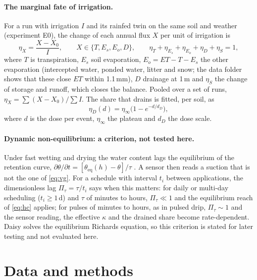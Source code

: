 \documentclass[preprint,12pt,authoryear]{elsarticle}
\newcommand{\ET}{\mathit{ET}}
\begin{document}
\paragraph{The marginal fate of irrigation.}
For a run with irrigation $I$ and its rainfed twin on the same soil and weather (experiment E0), the change of each annual flux $X$ per unit of irrigation is
\begin{equation}
\eta_X=\frac{X-X_{0}}{I},\qquad X\in\{T,E_s,E_o,D\},\qquad \eta_T+\eta_{E_s}+\eta_{E_o}+\eta_D+\eta_S=1,
\label{eq:eta}
\end{equation}
where $T$ is transpiration, $E_s$ soil evaporation, $E_o=\ET-T-E_s$ the other evaporation (intercepted water, ponded water, litter and snow; the data folder shows that these close $\ET$ within 1.1\,mm), $D$ drainage at 1\,m and $\eta_S$ the change of storage and runoff, which closes the balance. Pooled over a set of runs, $\eta_X=\sum(X-X_0)/\sum I$. The share that drains is fitted, per soil, as
\begin{equation}
\eta_D(d)=\eta_\infty\bigl(1-e^{-d/d_D}\bigr),
\label{eq:dose}
\end{equation}
where $d$ is the dose per event, $\eta_\infty$ the plateau and $d_D$ the dose scale.

\paragraph{Dynamic non-equilibrium: a criterion, not tested here.}
Under fast wetting and drying the water content lags the equilibrium of the retention curve, $\partial\theta/\partial t=[\theta_{\mathrm{eq}}(h)-\theta]/\tau$ \citep{RossSmettem2000,Hassanizadeh2002,Diamantopoulos2012VZJ,Diamantopoulos2012WRR}. A sensor then reads a suction that is not the one of \cref{eq:vg}. For a schedule with interval $t_i$ between applications, the dimensionless lag $\Pi_\tau=\tau/t_i$ says when this matters: for daily or multi-day scheduling ($t_i\geq1$\,d) and $\tau$ of minutes to hours, $\Pi_\tau\ll1$ and the equilibrium reach of \cref{eq:hc} applies; for pulses of minutes to hours, as in pulsed drip, $\Pi_\tau\sim1$ and the sensor reading, the effective $\kappa$ and the drained share become rate-dependent. Daisy solves the equilibrium Richards equation, so this criterion is stated for later testing and not evaluated here.

\section{Data and methods}
\end{document}
